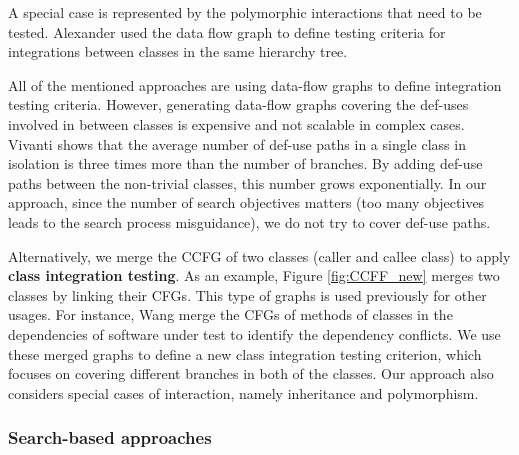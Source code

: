 
A special case is represented by the polymorphic interactions that need to be tested. Alexander \etal \cite{Alexander2000, Alexander2003, Alexander2004,Alexander2010} used the data flow graph to define testing criteria for integrations between classes in the same hierarchy tree.

 All of the mentioned approaches are using data-flow graphs to define integration testing criteria. However, generating data-flow graphs covering the def-uses involved in between classes is expensive and not scalable in complex cases. Vivanti \etal \cite{vivanti2013search} shows that the average number of def-use paths in a single class in isolation is three times more than the number of branches. By adding def-use paths between the non-trivial classes, this number grows exponentially.
 In our approach, since the number of search objectives matters (\ie too many objectives leads to the search process misguidance), we do not try to cover def-use paths. 

 Alternatively, we merge the CCFG of two classes (caller and callee class) to apply \textbf{class integration testing}. As an example, Figure \ref{fig:CCFF_new} merges two classes by linking their CFGs.
 This type of graphs is used previously for other usages. For instance, Wang \etal \cite{wang2019could} merge the CFGs of methods of classes in the dependencies of software under test to identify the dependency conflicts.
We use these merged graphs to define a new class integration testing criterion, which focuses on covering different branches in both of the classes. Our approach also considers special cases of interaction, namely inheritance and polymorphism. 


\subsubsection{Search-based approaches}

